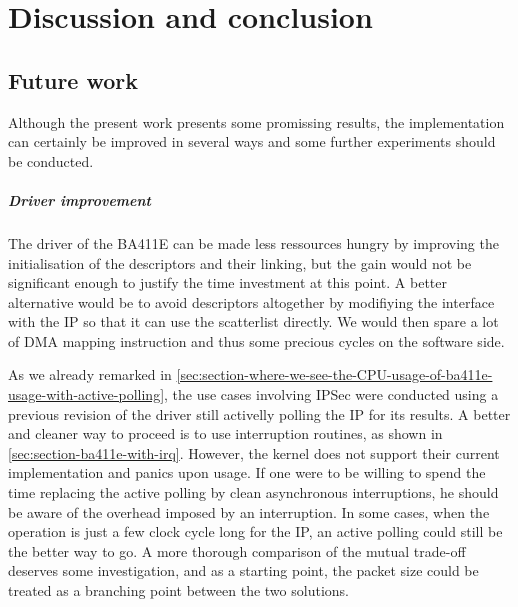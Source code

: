 \chapter{Discussion and conclusion}

\section{Future work}

Although the present work presents some promissing results, the implementation can certainly be improved in several ways and some further experiments should be conducted.

\paragraph{Driver improvement}
The driver of the BA411E can be made less ressources hungry by improving the initialisation of the descriptors and their linking, but the gain would not be significant enough to justify the time investment at this point.
A better alternative would be to avoid descriptors altogether by modifiying the interface with the IP so that it can use the scatterlist directly.
We would then spare a lot of DMA mapping instruction and thus some precious cycles on the software side.

As we already remarked in \ref{sec:section-where-we-see-the-CPU-usage-of-ba411e-usage-with-active-polling}, the use cases involving IPSec were conducted using a previous revision of the driver still activelly polling the IP for its results.
A better and cleaner way to proceed is to use interruption routines, as shown in \ref{sec:section-ba411e-with-irq}.
However, the kernel does not support their current implementation and panics upon usage.
If one were to be willing to spend the time replacing the active polling by clean asynchronous interruptions, he should be aware of the overhead imposed by an interruption.
In some cases, when the operation is just a few clock cycle long for the IP, an active polling could still be the better way to go.
A more thorough comparison of the mutual trade-off deserves some investigation, and as a starting point, the packet size could be treated as a branching point between the two solutions.


